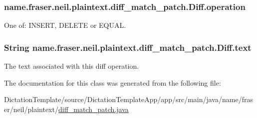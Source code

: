 \subsubsection[{\texorpdfstring{operation}{operation}}]{ name.\+fraser.\+neil.\+plaintext.\+diff\+\_\+match\+\_\+patch.\+Diff.\+operation}\hypertarget{classname_1_1fraser_1_1neil_1_1plaintext_1_1diff__match__patch_1_1Diff_a4a08d50147ba19eeaa7a4e511e7490db}{}\label{classname_1_1fraser_1_1neil_1_1plaintext_1_1diff__match__patch_1_1Diff_a4a08d50147ba19eeaa7a4e511e7490db}
One of\+: I\+N\+S\+E\+RT, D\+E\+L\+E\+TE or E\+Q\+U\+AL. 
\subsubsection[{\texorpdfstring{text}{text}}]{\setlength{\rightskip}{0pt plus 5cm}String name.\+fraser.\+neil.\+plaintext.\+diff\+\_\+match\+\_\+patch.\+Diff.\+text}\hypertarget{classname_1_1fraser_1_1neil_1_1plaintext_1_1diff__match__patch_1_1Diff_a1cc57ba795b3f2ed1ba92a103d16759e}{}\label{classname_1_1fraser_1_1neil_1_1plaintext_1_1diff__match__patch_1_1Diff_a1cc57ba795b3f2ed1ba92a103d16759e}
The text associated with this diff operation. 

The documentation for this class was generated from the following file\+:\begin{DoxyCompactItemize}
\item 
Dictation\+Template/source/\+Dictation\+Template\+App/app/src/main/java/name/fraser/neil/plaintext/\hyperlink{diff__match__patch_8java}{diff\+\_\+match\+\_\+patch.\+java}\end{DoxyCompactItemize}
